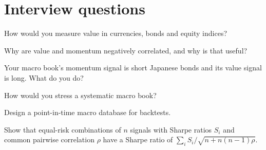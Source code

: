 \section{Interview questions}

\begin{interviewq}\label{iq:s2:systematic-macro:1}
How would you measure value in currencies, bonds and equity indices?
\end{interviewq}

\begin{interviewq}\label{iq:s2:systematic-macro:2}
Why are value and momentum negatively correlated, and why is that useful?
\end{interviewq}

\begin{interviewq}\label{iq:s2:systematic-macro:3}
Your macro book's momentum signal is short Japanese bonds and its value signal is long. What do you do?
\end{interviewq}

\begin{interviewq}\label{iq:s2:systematic-macro:4}
How would you stress a systematic macro book?
\end{interviewq}

\begin{interviewq}\label{iq:s2:systematic-macro:5}
Design a point-in-time macro database for backtests.
\end{interviewq}

\begin{interviewq}\label{iq:s2:systematic-macro:6}
Show that equal-risk combinations of $n$ signals with Sharpe ratios $S_i$ and common pairwise correlation $\rho$ have a Sharpe ratio of $\sum_i S_i /
\sqrt{n + n(n - 1)\rho}$.
\end{interviewq}
